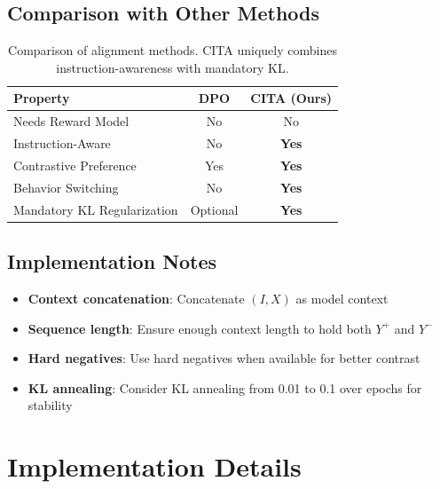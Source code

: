 \subsection{Comparison with Other Methods}

\begin{table}[H]
\centering
\small
\begin{tabular}{@{}lcc@{}}
\toprule
\textbf{Property} & \textbf{DPO} & \textbf{CITA (Ours)} \\
\midrule
Needs Reward Model & No & No \\
Instruction-Aware & No & \textbf{Yes} \\
Contrastive Preference & Yes & \textbf{Yes} \\
Behavior Switching & No & \textbf{Yes} \\
Mandatory KL Regularization & Optional & \textbf{Yes} \\
\bottomrule
\end{tabular}
\caption{Comparison of alignment methods. CITA uniquely combines instruction-awareness with mandatory KL.}
\label{tab:method_comparison_appendix}
\end{table}

\subsection{Implementation Notes}

\begin{itemize}[leftmargin=*,itemsep=2pt]
    \item \textbf{Context concatenation}: Concatenate $(I, X)$ as model context
    \item \textbf{Sequence length}: Ensure enough context length to hold both $Y^+$ and $Y^-$
    \item \textbf{Hard negatives}: Use hard negatives when available for better contrast
    \item \textbf{KL annealing}: Consider KL annealing from 0.01 to 0.1 over epochs for stability
\end{itemize}

\section{Implementation Details}
\label{sec:appendix_implementation}

